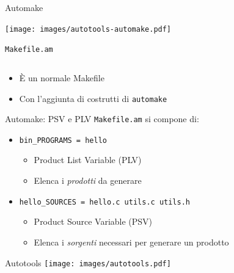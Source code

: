 \documentclass[xetex,table]{beamer}
\begin{document}
\begin{frame}{Automake}
  \begin{flushright}
    \texttt{[image: images/autotools-automake.pdf]}
  \end{flushright}

  \texttt{Makefile.am}
  \inputminted[bgcolor=codebackground,frame=single]{makefile}{examples/3-autotools-3/Makefile.am}

  \begin{itemize}
  \item È un normale Makefile
  \item Con l'aggiunta di costrutti di \texttt{automake}
  \end{itemize}
\end{frame}

\begin{frame}[fragile]{Automake: PSV e PLV}
  \texttt{Makefile.am} si compone di:

  \begin{itemize}
  \item \texttt{bin_PROGRAMS = hello}
    \begin{itemize}
    \item Product List Variable (PLV)
    \item Elenca i {\em prodotti} da generare
    \end{itemize}
  \end{itemize}

  \begin{itemize}
  \item \texttt{hello_SOURCES = hello.c utils.c utils.h}
    \begin{itemize}
    \item Product Source Variable (PSV)
    \item Elenca i {\em sorgenti} necessari per generare un prodotto
    \end{itemize}
  \end{itemize}

\end{frame}

\begin{frame}{Autotools}
  \center\texttt{[image: images/autotools.pdf]}
\end{frame}
\end{document}

